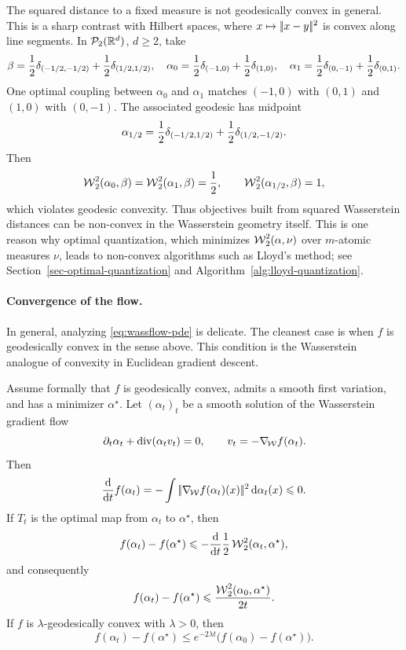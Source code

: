 The squared distance to a fixed measure is not geodesically convex in general. This is a sharp contrast with Hilbert spaces, where \(x\mapsto|\!| x-y |\!|^2\) is convex along line segments. In \(\mathcal{P}_2(\mathbb{R}^d)\), \(d\geq2\), take
\[
	\beta=\frac12\delta_{(-1/2,-1/2)}+\frac12\delta_{(1/2,1/2)},
	\quad
	\alpha_0=\frac12\delta_{(-1,0)}+\frac12\delta_{(1,0)},
	\quad
	\alpha_1=\frac12\delta_{(0,-1)}+\frac12\delta_{(0,1)} .
\]
One optimal coupling between \(\alpha_0\) and \(\alpha_1\) matches \((-1,0)\) with \((0,1)\) and \((1,0)\) with \((0,-1)\). The associated geodesic has midpoint
\[
	\alpha_{1/2}=\frac12\delta_{(-1/2,1/2)}+\frac12\delta_{(1/2,-1/2)} .
\]
Then
\[
	\operatorname{\mathcal{W}}_2^2(\alpha_0,\beta)
	=
	\operatorname{\mathcal{W}}_2^2(\alpha_1,\beta)
	=
	\frac12,
	\qquad
	\operatorname{\mathcal{W}}_2^2(\alpha_{1/2},\beta)
	=
	1,
\]
which violates geodesic convexity. Thus objectives built from squared Wasserstein distances can be non-convex in the Wasserstein geometry itself. This is one reason why optimal quantization, which minimizes \(\operatorname{\mathcal{W}}_2^2(\alpha,\nu)\) over \(m\)-atomic measures \(\nu\), leads to non-convex algorithms such as Lloyd's method; see Section~\ref{sec-optimal-quantization} and Algorithm~\ref{alg:lloyd-quantization}.

\paragraph{Convergence of the flow.}

In general, analyzing \eqref{eq:wassflow-pde} is delicate. The cleanest case is when $f$ is geodesically convex in the sense above. This condition is the Wasserstein analogue of convexity in Euclidean gradient descent.

\begin{prop}\label{prop-convex-wass-flow-rate}
	Assume formally that $f$ is geodesically convex, admits a smooth first variation, and has a minimizer $\alpha^\star$. Let $(\alpha_t)_t$ be a smooth solution of the Wasserstein gradient flow
	\[
		\partial_t\alpha_t+\operatorname{div}(\alpha_t v_t)=0,
		\qquad
		v_t=-\nabla_{\!\operatorname{\mathcal{W}}} f(\alpha_t).
	\]
	Then
	\[
		\frac{\mathrm{d}}{\mathrm{d} t} f(\alpha_t)
		=
		-\int |\!| \nabla_{\!\operatorname{\mathcal{W}}} f(\alpha_t)(x) |\!|^2\,\mathrm{d}\alpha_t(x)
		\leqslant 0.
	\]
	If $T_t$ is the optimal map from $\alpha_t$ to $\alpha^\star$, then
	\[
		f(\alpha_t)-f(\alpha^\star)
		\leqslant
		-\frac{\mathrm{d}}{\mathrm{d} t}\frac12 \operatorname{\mathcal{W}}_2^2(\alpha_t,\alpha^\star),
	\]
	and consequently
	\[
		f(\alpha_t)-f(\alpha^\star)
		\leqslant
		\frac{\operatorname{\mathcal{W}}_2^2(\alpha_0,\alpha^\star)}{2t}.
	\]
	If $f$ is $\lambda$-geodesically convex with $\lambda>0$, then
	\[
		f(\alpha_t)-f(\alpha^\star)
		\leq
		e^{-2\lambda t}\bigl(f(\alpha_0)-f(\alpha^\star)\bigr).
	\]
\end{prop}

